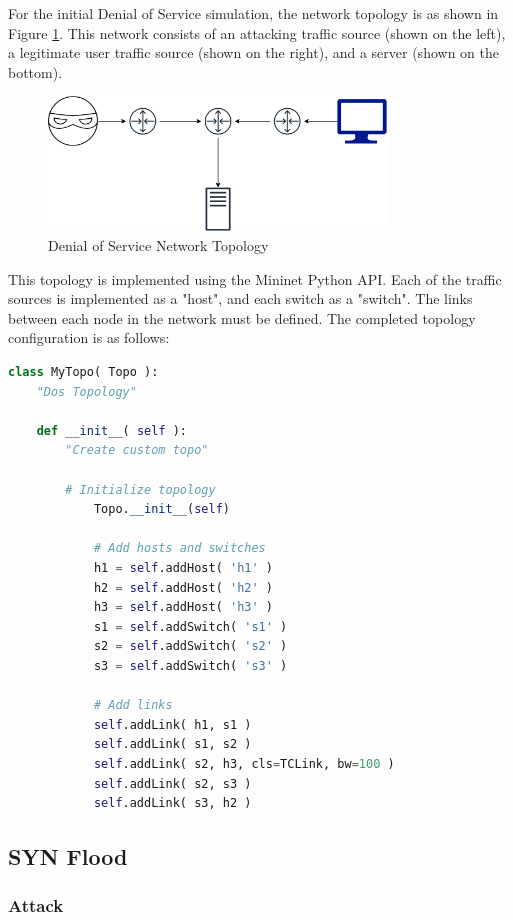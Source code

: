 For the initial Denial of Service simulation, the network topology is as shown
in Figure \ref{fig:dosNetwork}. This network consists of an attacking traffic
source (shown on the left), a legitimate user traffic source (shown on the
right), and a server (shown on the bottom).

\begin{figure}[H]
	\centering
	\includegraphics[width=0.8\textwidth]{images/DoS}
	\caption{Denial of Service Network Topology}
	\label{fig:dosNetwork}
\end{figure}

This topology is implemented using the Mininet Python API. Each of the traffic
sources is implemented as a "host", and each switch as a "switch". The links
between each node in the network must be defined. The completed topology
configuration is as follows:

\begin{lstlisting}[language=python, caption=DoS Simulation Network Topology]
class MyTopo( Topo ):
	"Dos Topology"

	def __init__( self ):
		"Create custom topo"

		# Initialize topology
	        Topo.__init__(self)

	        # Add hosts and switches
	        h1 = self.addHost( 'h1' )
	        h2 = self.addHost( 'h2' )
	        h3 = self.addHost( 'h3' )
	        s1 = self.addSwitch( 's1' )
	        s2 = self.addSwitch( 's2' )
	        s3 = self.addSwitch( 's3' )

	        # Add links
	        self.addLink( h1, s1 )
	        self.addLink( s1, s2 )
	        self.addLink( s2, h3, cls=TCLink, bw=100 )
	        self.addLink( s2, s3 )
	        self.addLink( s3, h2 )
\end{lstlisting}

\subsection{SYN Flood}

\subsubsection{Attack}


